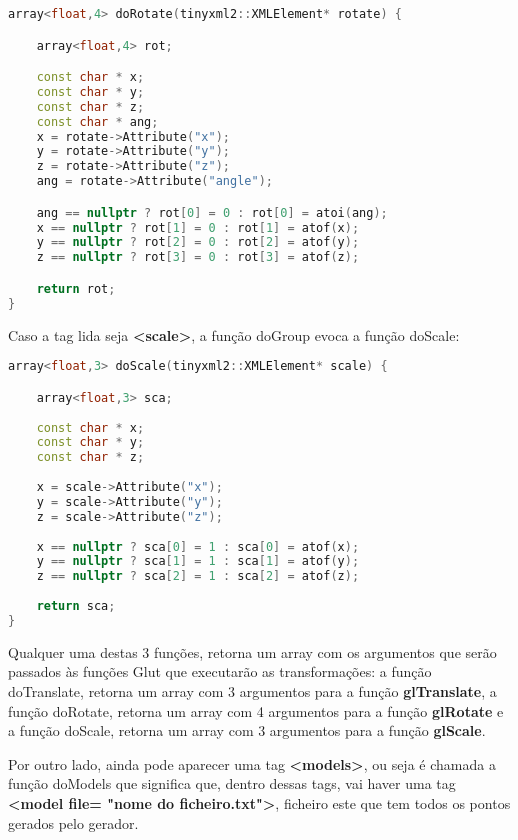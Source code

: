\documentclass{article}
\begin{document}
\begin{file}
	\begin{lstlisting}[language=C++]
array<float,4> doRotate(tinyxml2::XMLElement* rotate) {

    array<float,4> rot;

    const char * x;
    const char * y;
    const char * z;
    const char * ang;
    x = rotate->Attribute("x");
    y = rotate->Attribute("y");
    z = rotate->Attribute("z");
    ang = rotate->Attribute("angle");

    ang == nullptr ? rot[0] = 0 : rot[0] = atoi(ang);
    x == nullptr ? rot[1] = 0 : rot[1] = atof(x);
    y == nullptr ? rot[2] = 0 : rot[2] = atof(y);
    z == nullptr ? rot[3] = 0 : rot[3] = atof(z);

    return rot;	
}
	\end{lstlisting}
\end{file}

Caso a tag lida seja \textbf{<scale>}, a função doGroup evoca a função doScale:

\begin{file}
	\begin{lstlisting}[language=C++]
array<float,3> doScale(tinyxml2::XMLElement* scale) {

    array<float,3> sca;
    
    const char * x;
    const char * y;
    const char * z;
    
    x = scale->Attribute("x");
    y = scale->Attribute("y");
    z = scale->Attribute("z");
    
    x == nullptr ? sca[0] = 1 : sca[0] = atof(x);
    y == nullptr ? sca[1] = 1 : sca[1] = atof(y);
    z == nullptr ? sca[2] = 1 : sca[2] = atof(z);
    
    return sca;
}
	\end{lstlisting}
\end{file}

Qualquer uma destas 3 funções, retorna um array com os argumentos que serão passados às funções Glut que executarão as transformações: a função doTranslate, retorna um array com 3 argumentos para a função \textbf{glTranslate}, a função doRotate, retorna um array com 4 argumentos para a função \textbf{glRotate} e a função doScale, retorna um array com 3 argumentos para a função \textbf{glScale}.

\par Por outro lado, ainda pode aparecer uma tag \textbf{<models>}, ou seja é chamada a função doModels que significa que, dentro dessas tags, vai haver uma tag \textbf{<model file= "nome do ficheiro.txt">}, ficheiro este que tem todos os pontos gerados pelo gerador. 
\end{document}
